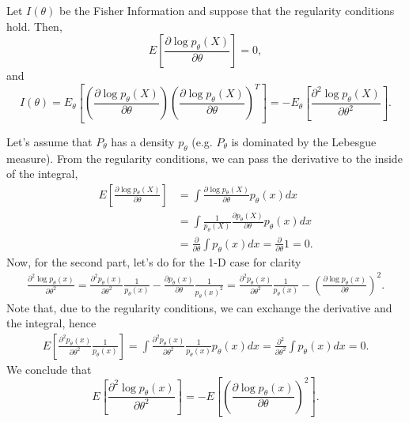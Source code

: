 \begin{proposition}
	Let $I(\theta)$ be the Fisher Information and suppose that the regularity conditions hold. Then,
	\begin{equation}
		E\left[
			\frac{\partial \log p_\theta(X)}{\partial \theta}
			\right] = 0,
	\end{equation}
	and
	\begin{equation}
		I(\theta)
		= E_\theta \left[
			\left(
			\frac{\partial  \log p_\theta(X)}{\partial \theta}
			\right)
			\left(
			\frac{\partial  \log p_\theta(X)}{\partial \theta}
			\right)^T
			\right]
		= - E_\theta \left[
			\frac{\partial^2  \log p_\theta(X)}{\partial \theta^2}
			\right].
	\end{equation}
\end{proposition}
\begin{prf}
	Let's assume that $P_\theta$ has a density $p_\theta$
	(e.g. $P_\theta$ is dominated by the Lebesgue measure).
	From the regularity conditions, we can pass the derivative to the inside
	of the integral,
	\begin{align*}
		E\left[
			\frac{\partial \log p_\theta(X)}{\partial \theta}
		\right] & =
		\int \frac{\partial \log p_\theta(X)}{\partial \theta} p_\theta(x) dx \\
		        & =
		\int \frac{1}{p_\theta(X)}
		\frac{\partial p_\theta(X)}{\partial \theta} p_\theta(x) dx           \\
		        & =
		\frac{\partial}{\partial \theta} \int p_\theta(x) dx =
		\frac{\partial}{\partial \theta} 1 =0.
	\end{align*}
	Now, for the second part, let's do for the 1-D case for clarity
	\begin{align*}
		\frac{\partial^2 \log p_\theta(x)}{\partial \theta^2} =
		\frac{\partial^2 p_\theta(x)}{\partial \theta^2} \frac{1}{p_\theta(x)}
		- \frac{\partial p_\theta(x)}{\partial \theta} \frac{1}{p_\theta(x)^2}
		=
		\frac{\partial^2 p_\theta(x)}{\partial \theta^2} \frac{1}{p_\theta(x)}
		- \left(
		\frac{\partial \log p_\theta(x)}{\partial \theta}
		\right)^2.
	\end{align*}
	Note that, due to the regularity conditions, we can exchange the derivative and the integral, hence
	\begin{align*}
		E[\frac{\partial^2 p_\theta(x)}{\partial \theta^2} \frac{1}{p_\theta(x)}] =
		\int \frac{\partial^2 p_\theta(x)}{\partial \theta^2} \frac{1}{p_\theta(x)} p_\theta(x) dx
		= \frac{\partial^2}{\partial \theta^2} \int p_\theta(x) dx = 0.
	\end{align*}
	We conclude that
	\begin{equation*}
		E\left[\frac{\partial^2 \log p_\theta(x)}{\partial \theta^2}\right] = -
		E\left[
			\left(
			\frac{\partial \log p_\theta(x)}{\partial \theta}
			\right)^2
			\right].
	\end{equation*}
\end{prf}


